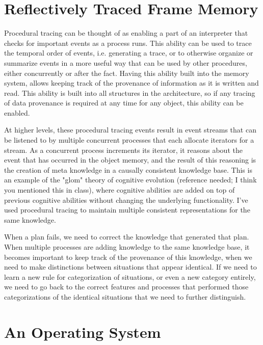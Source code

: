 \section{Reflectively Traced Frame Memory}

Procedural tracing can be thought of as enabling a part of an
interpreter that checks for important events as a process runs.  This
ability can be used to trace the temporal order of events, i.e.
generating a trace, or to otherwise organize or summarize events in a
more useful way that can be used by other procedures, either
concurrently or after the fact.  Having this ability built into the
memory system, allows keeping track of the provenance of information as
it is written and read.  This ability is built into all structures in
the architecture, so if any tracing of data provenance is required at
any time for any object, this ability can be enabled.

At higher levels, these procedural tracing events result in event
streams that can be listened to by multiple concurrent processes that
each allocate iterators for a stream.  As a concurrent process
increments its iterator, it reasons about the event that has occurred in
the object memory, and the result of this reasoning is the creation of
meta knowledge in a causally consistent knowledge base.  This is an
example of the "glom" theory of cognitive evolution (reference needed; I
think you mentioned this in class), where cognitive abilities are added
on top of previous cognitive abilities without changing the underlying
functionality.  I've used procedural tracing to maintain multiple
consistent representations for the same knowledge.

When a plan fails, we need to correct the knowledge that generated that
plan.  When multiple processes are adding knowledge to the same
knowledge base, it becomes important to keep track of the provenance of
this knowledge, when we need to make distinctions between situations
that appear identical.  If we need to learn a new rule for
categorization of situations, or even a new category entirely, we need
to go back to the correct features and processes that performed those
categorizations of the identical situations that we need to further
distinguish.



\section{An Operating System}

